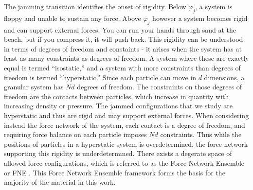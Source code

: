 
The jamming transition identifies the onset of rigidity. Below $\varphi_j$, a system is floppy and unable to sustain any force. Above $\varphi_j$ however a system becomes rigid and can support external forces. You can run your hands through sand at the beach, but if you compress it, it will push back. This rigidity can be understood in terms of degrees of freedom and constaints - it arises when the system has at least as many constraints as degrees of freedom. A system where these are exactly equal is termed ``isostatic,'' and a system with more constraints than degrees of freedom is termed ``hyperstatic.'' Since each particle can move in $d$ dimensions, a granular system has $Nd$ degrees of freedom. The constraints on those degrees of freedom are the contacts between particles, which increase in quantity with increasing density or pressure. The jammed configurations that we study are hyperstatic and thus are rigid and may support external forces. When considering instead the force network of the system, each contact is a degree of freedom, and requiring force balance on each particle imposes $Nd$ constraints. Thus while the positions of particles in a hyperstatic system is overdetermined, the force network supporting this rigidity is underdetermined. There exists a degerate space of allowed force configurations, which is referred to as the Force Network Ensemble or FNE \cite{snoeijer_force_2004,tighe_force_2010}. This Force Network Ensemble framework forms the basis for the majority of the material in this work.



